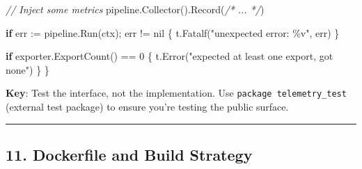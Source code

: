 \documentclass[
]{article}
\newenvironment{Shaded}{}{}
\newcommand{\CommentTok}[1]{\textcolor[rgb]{0.38,0.63,0.69}{\textit{#1}}}
\newcommand{\ControlFlowTok}[1]{\textcolor[rgb]{0.00,0.44,0.13}{\textbf{#1}}}
\newcommand{\DecValTok}[1]{\textcolor[rgb]{0.25,0.63,0.44}{#1}}
\newcommand{\NormalTok}[1]{#1}
\newcommand{\OperatorTok}[1]{\textcolor[rgb]{0.40,0.40,0.40}{#1}}
\newcommand{\OtherTok}[1]{\textcolor[rgb]{0.00,0.44,0.13}{#1}}
\newcommand{\StringTok}[1]{\textcolor[rgb]{0.25,0.44,0.63}{#1}}
\begin{document}
\begin{Shaded}
\begin{Highlighting}[]
    \CommentTok{// Inject some metrics}
\NormalTok{    pipeline}\OperatorTok{.}\NormalTok{Collector}\OperatorTok{().}\NormalTok{Record}\OperatorTok{(}\CommentTok{/* ... */}\OperatorTok{)}

    \ControlFlowTok{if}\NormalTok{ err }\OperatorTok{:=}\NormalTok{ pipeline}\OperatorTok{.}\NormalTok{Run}\OperatorTok{(}\NormalTok{ctx}\OperatorTok{);}\NormalTok{ err }\OperatorTok{!=} \OtherTok{nil} \OperatorTok{\{}
\NormalTok{        t}\OperatorTok{.}\NormalTok{Fatalf}\OperatorTok{(}\StringTok{"unexpected error: \%v"}\OperatorTok{,}\NormalTok{ err}\OperatorTok{)}
    \OperatorTok{\}}

    \ControlFlowTok{if}\NormalTok{ exporter}\OperatorTok{.}\NormalTok{ExportCount}\OperatorTok{()} \OperatorTok{==} \DecValTok{0} \OperatorTok{\{}
\NormalTok{        t}\OperatorTok{.}\NormalTok{Error}\OperatorTok{(}\StringTok{"expected at least one export, got none"}\OperatorTok{)}
    \OperatorTok{\}}
\OperatorTok{\}}
\end{Highlighting}
\end{Shaded}

\textbf{Key}: Test the interface, not the implementation. Use
\texttt{package\ telemetry\_test} (external test package) to ensure
you're testing the public surface.

\begin{center}\rule{0.5\linewidth}{0.5pt}\end{center}

\hypertarget{dockerfile-and-build-strategy}{%
\subsection{11. Dockerfile and Build
Strategy}\label{dockerfile-and-build-strategy}}
\end{document}
